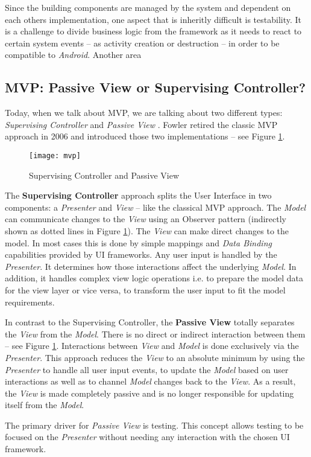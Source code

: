 Since the building components are managed by the system and dependent on each others implementation, one aspect that is inheritly difficult is testability. It is a challenge to divide business logic from the framework as it needs to react to certain system events -- as activity creation or destruction -- in order to be compatible to \emph{Android}. Another area 


\subsection{MVP: Passive View or Supervising Controller?}

Today, when we talk about MVP, we are talking about two different types: \emph{Supervising Controller} \cite{FowlerSupervisingController} and \emph{Passive View} \cite{FowlerPassiveView}. Fowler retired the classic MVP approach in 2006 \cite{FowlerMvpRetirementNote} and introduced those two implementations -- see Figure \ref{fig:mvp}.

\begin{figure}[!t]
\centering
\texttt{[image: mvp]}
\caption{Supervising Controller and Passive View}
\label{fig:mvp}
\end{figure}

The \textbf{Supervising Controller} approach splits the User Interface in two components: a \emph{Presenter} and \emph{View} – like the classical MVP approach. The \emph{Model} can communicate changes to the \emph{View} using an Observer pattern (indirectly shown as dotted lines in Figure \ref{fig:mvp}). The \emph{View} can make direct changes to the model. In most cases this is done by simple mappings and \emph{Data Binding} capabilities provided by UI frameworks. Any user input is handled by the \emph{Presenter}. It determines how those interactions affect the underlying \emph{Model}. In addition, it handles complex view logic operations i.e. to prepare the model data for the view layer or vice versa, to transform the user input to fit the model requirements.

In contrast to the Supervising Controller, the \textbf{Passive View} totally separates the \emph{View} from the \emph{Model}. There is no direct or indirect interaction between them -- see Figure \ref{fig:mvp}. Interactions between \emph{View} and \emph{Model} is done exclusively via the \emph{Presenter}. This approach reduces the \emph{View} to an absolute minimum by using the \emph{Presenter} to handle all user input events, to update the \emph{Model} based on user interactions as well as to channel \emph{Model} changes back to the \emph{View}. As a result, the \emph{View} is made completely passive and is no longer responsible for updating itself from the \emph{Model}.

The primary driver for \emph{Passive View} is testing. This concept allows testing to be focused on the \emph{Presenter} without needing any interaction with the chosen UI framework.
